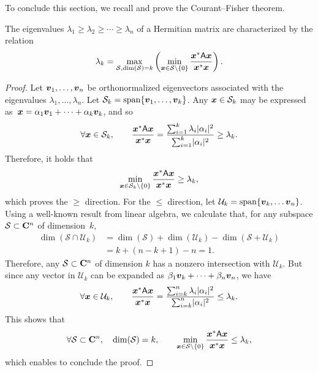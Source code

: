 To conclude this section,
we recall and prove the Courant--Fisher theorem.
\begin{theorem}
    \label{theorem:courant-fisher}
    The eigenvalues $\lambda_1 \geq \lambda_2 \geq \dotsb \geq \lambda_n$ of a Hermitian matrix are characterized by the relation
    \[
        \lambda_k = \max_{\mathcal S, {\rm dim}(\mathcal S) = k} \left( \min_{\mathbf{\boldsymbol{x}} \in \mathcal S \backslash\{0\}} \frac{\mathbf{\boldsymbol{x}}^* \mathsf A \mathbf{\boldsymbol{x}}}{\mathbf{\boldsymbol{x}}^* \mathbf{\boldsymbol{x}}} \right).
    \]
\end{theorem}
\begin{proof}
    Let $\mathbf{\boldsymbol{v}}_1, \dotsc, \mathbf{\boldsymbol{v}}_n$ be orthonormalized eigenvectors associated with the eigenvalues $\lambda_1, \dotsc, \lambda_n$.
    Let $\mathcal S_k = \operatorname{span} \{ \mathbf{\boldsymbol{v}}_1, \dotsc, \mathbf{\boldsymbol{v}}_k \}$.
    Any $\mathbf{\boldsymbol{x}} \in \mathcal S_k$ may be expressed as~$\mathbf{\boldsymbol{x}} = \alpha_1 \mathbf{\boldsymbol{v}}_1 + \dotsb + \alpha_k \mathbf{\boldsymbol{v}}_k$,
    and so
    \[
        \forall \mathbf{\boldsymbol{x}} \in \mathcal S_k, \qquad
        \frac{\mathbf{\boldsymbol{x}}^* \mathsf A \mathbf{\boldsymbol{x}}}{\mathbf{\boldsymbol{x}}^* \mathbf{\boldsymbol{x}}} =
        \frac{\sum_{i=1}^{k} \lambda_i \lvert\alpha_i\rvert^2}{\sum_{i=1}^{k} \lvert\alpha_i\rvert^2}
        \geq \lambda_k.
    \]
    Therefore,
    it holds that
    \[
         \min_{\mathbf{\boldsymbol{x}} \in \mathcal S_k \backslash\{0\}} \frac{\mathbf{\boldsymbol{x}}^* \mathsf A \mathbf{\boldsymbol{x}}}{\mathbf{\boldsymbol{x}}^* \mathbf{\boldsymbol{x}}}  \geq \lambda_k,
    \]
    which proves the $\geq$ direction.
    For the $\leq$ direction,
    let $\mathcal U_k = \operatorname{span} \{ \mathbf{\boldsymbol{v}}_{k}, \dots \mathbf{\boldsymbol{v}}_n \}$.
    Using a well-known result from linear algebra,
    we calculate that, for any subspace $\mathcal S \subset \mathbf C^n$ of dimension~$k$,
    \begin{align*}
        \dim(\mathcal S \cap \mathcal U_k)
        &= \dim(\mathcal S) + \dim(\mathcal U_k) -\dim(\mathcal S + \mathcal U_k) \\
        &=  k + (n - k + 1) - n = 1.
    \end{align*}
    Therefore, any $\mathcal S \subset \mathbf C^n$ of dimension $k$
    has a nonzero intersection with $\mathcal U_k$.
    But since any vector in $\mathcal U_k$ can be expanded as $\beta_1 \mathbf{\boldsymbol{v}}_k + \dotsb + \beta_n \mathbf{\boldsymbol{v}}_n$,
    we have
    \[
        \forall \mathbf{\boldsymbol{x}} \in \mathcal U_k, \qquad
        \frac{\mathbf{\boldsymbol{x}}^* \mathsf A \mathbf{\boldsymbol{x}}}{\mathbf{\boldsymbol{x}}^* \mathbf{\boldsymbol{x}}} =
        \frac{\sum_{i=k}^{n} \lambda_i \lvert\alpha_i\rvert^2}{\sum_{i=k}^{n} \lvert\alpha_i\rvert^2}
        \leq \lambda_k.
    \]
    This shows that
    \[
        \forall \mathcal S \subset \mathbf C^n, \quad \dim(\mathcal S) = k,
        \qquad
         \min_{\mathbf{\boldsymbol{x}} \in \mathcal S \backslash\{0\}} \frac{\mathbf{\boldsymbol{x}}^* \mathsf A \mathbf{\boldsymbol{x}}}{\mathbf{\boldsymbol{x}}^* \mathbf{\boldsymbol{x}}}  \leq \lambda_k,
    \]
    which enables to conclude the proof.
\end{proof}

